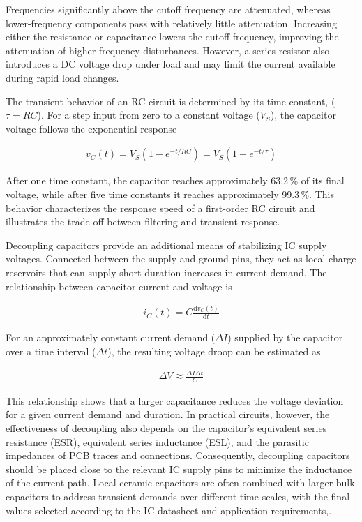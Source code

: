 \documentclass[fontsize=11pt,%
twoside,%
BCOR          = 8mm, %
DIV           = 11,  %
titlepage     = off,%
index=totoc,%
xcolor        = pdftex,%
dvipsnames,%
bibliography  = totoc,%
bibliography = numbered, %
listof        = notnumbered]{scrreprt}
\begin{document}
Frequencies significantly above the cutoff frequency are attenuated, whereas lower-frequency components pass with relatively little attenuation. Increasing either the resistance or capacitance lowers the cutoff frequency, improving the attenuation of higher-frequency disturbances. However, a series resistor also introduces a DC voltage drop under load and may limit the current available during rapid load changes\cite{FundamentalsElectricalCircuits}.

The transient behavior of an RC circuit is determined by its time constant, ($\tau = RC$). For a step input from zero to a constant voltage ($V_S$), the capacitor voltage follows the exponential response

\begin{align}
	v_C(t) = V_S\left(1-e^{-t/RC}\right) = V_S\left(1-e^{-t/\tau}\right)
\end{align}


After one time constant, the capacitor reaches approximately 63.2\,\% of its final voltage, while after five time constants it reaches approximately 99.3\,\%. This behavior characterizes the response speed of a first-order RC circuit and illustrates the trade-off between filtering and transient response\cite{FundamentalsElectricalCircuits}.

Decoupling capacitors provide an additional means of stabilizing IC supply voltages. Connected between the supply and ground pins, they act as local charge reservoirs that can supply short-duration increases in current demand. The relationship between capacitor current and voltage is

\begin{align}
	i_C(t)=C\frac{\text{d}v_C(t)}{\text{d}t}
\end{align}

For an approximately constant current demand ($\Delta I$) supplied by the capacitor over a time interval ($\Delta t$), the resulting voltage droop can be estimated as

\begin{align}
	\Delta V\approx\frac{\Delta I\Delta t}{C}
\end{align}

This relationship shows that a larger capacitance reduces the voltage deviation for a given current demand and duration. In practical circuits, however, the effectiveness of decoupling also depends on the capacitor's equivalent series resistance (ESR), equivalent series inductance (ESL), and the parasitic impedances of PCB traces and connections. Consequently, decoupling capacitors should be placed close to the relevant IC supply pins to minimize the inductance of the current path. Local ceramic capacitors are often combined with larger bulk capacitors to address transient demands over different time scales, with the final values selected according to the IC datasheet and application requirements\cite{LowPassFilterConsiderations},\cite{LowPassFilterPerformance}.
\end{document}
